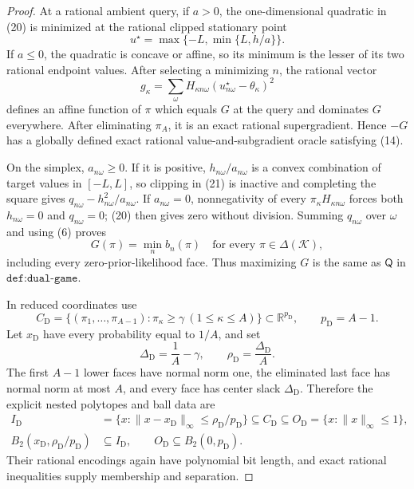 \documentclass{article}
\begin{document}
\begin{proof}
At a rational ambient query, if \(a>0\), the one-dimensional quadratic in (20) is minimized at the rational clipped stationary point
\[
 u^\star=\max\{-L,\min\{L,h/a\}\}.
\tag{21}
\]
If \(a\le0\), the quadratic is concave or affine, so its minimum is the lesser of its two rational endpoint values.  After selecting a minimizing \(n\), the rational vector
\[
 g_\kappa=\sum_\omega H_{\kappa n\omega}
                 (u^\star_{n\omega}-\theta_\kappa)^2
\tag{22}
\]
defines an affine function of \(\pi\) which equals \(G\) at the query and dominates \(G\) everywhere.  After eliminating \(\pi_A\), it is an exact rational supergradient.  Hence \(-G\) has a globally defined exact rational value-and-subgradient oracle satisfying (14).

On the simplex, \(a_{n\omega}\ge0\).  If it is positive, \(h_{n\omega}/a_{n\omega}\) is a convex combination of target values in \([-L,L]\), so clipping in (21) is inactive and completing the square gives \(q_{n\omega}-h_{n\omega}^2/a_{n\omega}\).  If \(a_{n\omega}=0\), nonnegativity of every \(\pi_\kappa H_{\kappa n\omega}\) forces both \(h_{n\omega}=0\) and \(q_{n\omega}=0\); (20) then gives zero without division.  Summing \(q_{n\omega}\) over \(\omega\) and using (6) proves
\[
 G(\pi)=\min_n b_n(\pi)
 \quad\text{for every }\pi\in\Delta(\mathcal K),
\tag{23}
\]
including every zero-prior-likelihood face.  Thus maximizing \(G\) is the same as \(\mathsf Q\) in \(\texttt{def:dual-game}\).

In reduced coordinates use
\[
 C_{\mathrm D}=\{(\pi_1,\ldots,\pi_{A-1}):
                 \pi_\kappa\ge\gamma\ (1\le\kappa\le A)\}
       \subset\mathbb R^{p_{\mathrm D}},
 \qquad p_{\mathrm D}=A-1.
\tag{24}
\]
Let \(x_{\mathrm D}\) have every probability equal to \(1/A\), and set
\[
 \Delta_{\mathrm D}=\frac1A-\gamma,
 \qquad \rho_{\mathrm D}=\frac{\Delta_{\mathrm D}}A.
\tag{25}
\]
The first \(A-1\) lower faces have normal norm one, the eliminated last face has normal norm at most \(A\), and every face has center slack \(\Delta_{\mathrm D}\).  Therefore the explicit nested polytopes and ball data are
\[
 \begin{split}
 I_{\mathrm D}&=\{x:\|x-x_{\mathrm D}\|_\infty
                         \le\rho_{\mathrm D}/p_{\mathrm D}\}
       \subseteq C_{\mathrm D}
       \subseteq O_{\mathrm D}=\{x:\|x\|_\infty\le1\},\\
 B_2(x_{\mathrm D},\rho_{\mathrm D}/p_{\mathrm D})
       &\subseteq I_{\mathrm D},
 \qquad O_{\mathrm D}\subseteq B_2(0,p_{\mathrm D}).
 \end{split}
\tag{26}
\]
Their rational encodings again have polynomial bit length, and exact rational inequalities supply membership and separation.


\end{proof}
\end{document}

